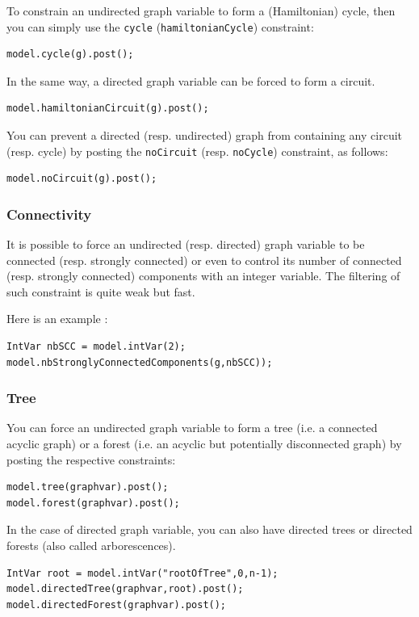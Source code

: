 \documentclass{article}
\begin{document}
To constrain an undirected graph variable to form a (Hamiltonian) cycle, then you can simply use the \texttt{cycle} (\texttt{hamiltonianCycle}) constraint: 
\begin{lstlisting}
model.cycle(g).post();
\end{lstlisting} 
In the same way, a directed graph variable can be forced to form a circuit.
\begin{lstlisting}
model.hamiltonianCircuit(g).post();
\end{lstlisting} 

You can prevent a directed (resp. undirected) graph from containing any circuit (resp. cycle) by posting the \texttt{noCircuit} (resp. \texttt{noCycle}) constraint, as follows:
\begin{lstlisting}
model.noCircuit(g).post();
\end{lstlisting}


\subsubsection{Connectivity}

It is possible to force an undirected (resp. directed) graph variable to be connected (resp. strongly connected) or even to control its number of connected (resp. strongly connected) components with an integer variable. The filtering of such constraint is quite weak but fast.

Here is an example :
\begin{lstlisting}
IntVar nbSCC = model.intVar(2);
model.nbStronglyConnectedComponents(g,nbSCC));
\end{lstlisting}

\subsubsection{Tree}

You can force an undirected graph variable to form a tree (i.e. a connected acyclic graph) or a forest (i.e. an acyclic but potentially disconnected graph) by posting the respective constraints: 
\begin{lstlisting}
model.tree(graphvar).post();
model.forest(graphvar).post();
\end{lstlisting}

In the case of directed graph variable, you can also have directed trees or directed forests (also called arborescences). 
\begin{lstlisting}
IntVar root = model.intVar("rootOfTree",0,n-1);
model.directedTree(graphvar,root).post();
model.directedForest(graphvar).post();
\end{lstlisting}
\end{document}
